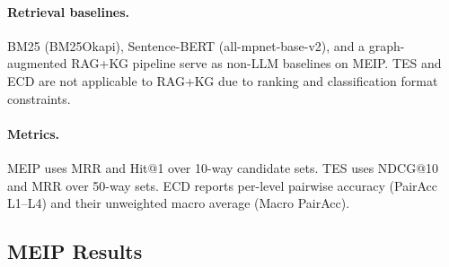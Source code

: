 \documentclass[11pt]{article}
\begin{document}
\paragraph{Retrieval baselines.}
BM25 (BM25Okapi), Sentence-BERT (all-mpnet-base-v2), and a
graph-augmented RAG+KG pipeline serve as non-LLM baselines on MEIP.
TES and ECD are not applicable to RAG+KG due to ranking and classification
format constraints.

\paragraph{Metrics.}
MEIP uses MRR and Hit@1 over 10-way candidate sets.
TES uses NDCG@10 and MRR over 50-way sets.
ECD reports per-level pairwise accuracy (PairAcc L1--L4) and their
unweighted macro average (Macro PairAcc).

\subsection{MEIP Results}
\end{document}
